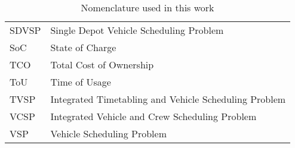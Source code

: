 \documentclass[]{article}
\begin{document}
\begin{table}
\begin{tabular}{ll}
    SDVSP                                     & Single Depot Vehicle Scheduling Problem               \\
    SoC                                       & State of Charge                                       \\
    TCO                                       & Total Cost of Ownership                               \\
    ToU                                       & Time of Usage                                         \\
    TVSP                                      & Integrated Timetabling and Vehicle Scheduling Problem \\
    VCSP                                      & Integrated Vehicle and Crew Scheduling Problem        \\
    VSP                                       & Vehicle Scheduling Problem                            \\
    \bottomrule
  \end{tabular}
  \label{tab:nomenclature}
  \caption{Nomenclature used in this work}
\end{table}
\end{document}
